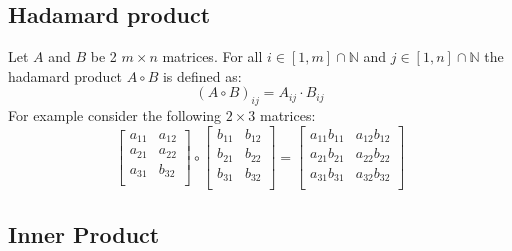 \documentclass[12pt]{article}
\begin{document}
\subsection{Hadamard product}\label{sec:hadamerd_product}
Let \(A\) and \(B\) be 2 \(m \times n\) matrices. For all \(i \in [1, m]\cap\mathbb N\) and \(j \in [1, n]\cap\mathbb N\)
the hadamard product \(A \circ B\) is defined as:
\begin{equation} \label{eq:defs:Hadamard product}
\left(A \circ B\right)_{ij} = A_{ij} \cdot B_{ij}
\end{equation}
For example consider the following \(2 \times 3\) matrices:
\[
\left[
\begin{array}{ll}
a_{11} & a_{12} \\
a_{21} & a_{22} \\
a_{31} & b_{32} \\
\end{array}
\right] \circ 
\left[
\begin{array}{ll}
b_{11} & b_{12} \\
b_{21} & b_{22} \\
b_{31} & b_{32} \\
\end{array}
\right] = 
\left[
\begin{array}{ll}
a_{11}b_{11} & a_{12}b_{12} \\
a_{21}b_{21} & a_{22}b_{22} \\
a_{31}b_{31} & a_{32}b_{32} \\
\end{array}
\right]
\]

\subsection{Inner Product}
\end{document}
